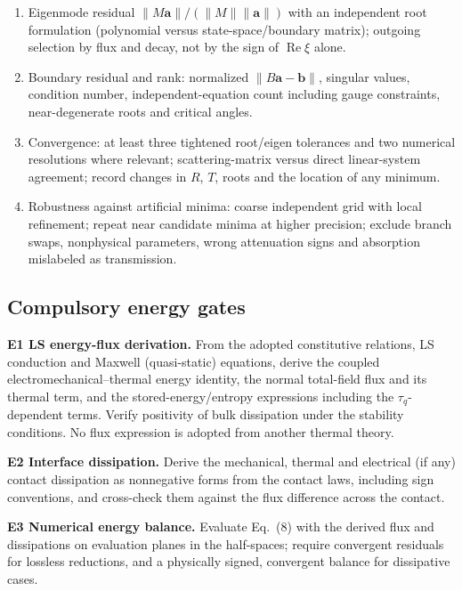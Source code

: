 \documentclass[11pt]{article}
\begin{document}
\begin{enumerate}
  \item Eigenmode residual $\lVert M\bm{a}\rVert/(\lVert M\rVert\lVert\bm{a}\rVert)$
    with an independent root formulation (polynomial versus state-space/boundary
    matrix); outgoing selection by flux and decay, not by the sign of
    $\operatorname{Re}\xi$ alone.
  \item Boundary residual and rank: normalized $\lVert B\bm{a}-\bm{b}\rVert$,
    singular values, condition number, independent-equation count including gauge
    constraints, near-degenerate roots and critical angles.
  \item Convergence: at least three tightened root/eigen tolerances and two
    numerical resolutions where relevant; scattering-matrix versus direct
    linear-system agreement; record changes in $R$, $T$, roots and the location
    of any minimum.
  \item Robustness against artificial minima: coarse independent grid with local
    refinement; repeat near candidate minima at higher precision; exclude branch
    swaps, nonphysical parameters, wrong attenuation signs and absorption
    mislabeled as transmission.
\end{enumerate}

\subsection{Compulsory energy gates}

\textbf{E1 LS energy-flux derivation.} From the adopted constitutive relations,
LS conduction and Maxwell (quasi-static) equations, derive the coupled
electromechanical--thermal energy identity, the normal total-field flux and its
thermal term, and the stored-energy/entropy expressions including the
$\tau_q$-dependent terms. Verify positivity of bulk dissipation under the
stability conditions. No flux expression is adopted from another thermal theory.

\textbf{E2 Interface dissipation.} Derive the mechanical, thermal and electrical
(if any) contact dissipation as nonnegative forms from the contact laws, including
sign conventions, and cross-check them against the flux difference across the
contact.

\textbf{E3 Numerical energy balance.} Evaluate Eq.\ (8) with the derived flux and
dissipations on evaluation planes in the half-spaces; require convergent residuals
for lossless reductions, and a physically signed, convergent balance for
dissipative cases.
\end{document}
